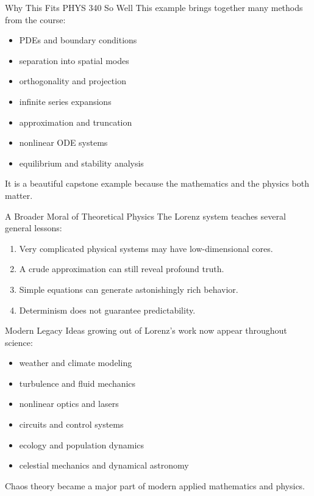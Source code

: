 \documentclass[aspectratio=169]{beamer}
\begin{document}
\begin{frame}{Why This Fits PHYS 340 So Well}
This example brings together many methods from the course:
\begin{itemize}
\item PDEs and boundary conditions
\item separation into spatial modes
\item orthogonality and projection
\item infinite series expansions
\item approximation and truncation
\item nonlinear ODE systems
\item equilibrium and stability analysis
\end{itemize}

It is a beautiful capstone example because the mathematics and the physics both matter.
\end{frame}

\begin{frame}{A Broader Moral of Theoretical Physics}
The Lorenz system teaches several general lessons:
\begin{enumerate}
\item Very complicated physical systems may have low-dimensional cores.
\item A crude approximation can still reveal profound truth.
\item Simple equations can generate astonishingly rich behavior.
\item Determinism does not guarantee predictability.
\end{enumerate}
\end{frame}

\begin{frame}{Modern Legacy}
Ideas growing out of Lorenz's work now appear throughout science:
\begin{itemize}
\item weather and climate modeling
\item turbulence and fluid mechanics
\item nonlinear optics and lasers
\item circuits and control systems
\item ecology and population dynamics
\item celestial mechanics and dynamical astronomy
\end{itemize}

Chaos theory became a major part of modern applied mathematics and physics.
\end{frame}
\end{document}
